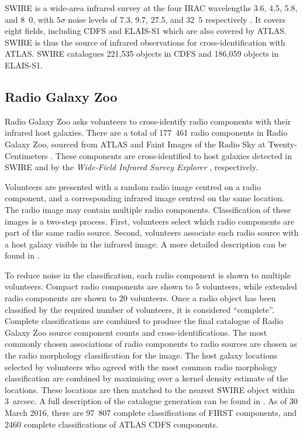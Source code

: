 \documentclass[fleqn,usenatbib,usedcolumn]{mnras}
\newcommand{\jansky}{\text{Jy}}
\begin{document}
    SWIRE \citep{lonsdale03swire, surace05swire} is a wide-area infrared survey
    at the four IRAC wavelengths 3.6, 4.5, 5.8, and
    \unit{8.0}{\micro\meter}, with $5\sigma$ noise levels of 7.3,
    9.7, 27.5, and \unit{32.5}{\micro\jansky} respectively
    \citep{lonsdale03swire}. It covers eight fields, including CDFS and ELAIS-S1
    which are also covered by ATLAS. SWIRE is thus the source of infrared
    observations for cross-identification with ATLAS. SWIRE catalogues 221,535
    objects in CDFS and 186,059 objects in ELAIS-S1.

  \subsection{Radio Galaxy Zoo}\label{sec:rgz}

    Radio Galaxy Zoo asks volunteers to cross-identify radio components with
    their infrared host galaxies. There are a total of 177~461 radio components
    in Radio Galaxy Zoo, sourced from ATLAS and Faint Images of the Radio Sky at
    Twenty-Centimeters \citep[FIRST;][]{white97first}. These components are
    cross-identified to host galaxies detected in SWIRE and by the
    \emph{Wide-Field Infrared Survey Explorer} \citep[WISE;][]{wright10wise},
    respectively.

    Volunteers are presented with a random radio image centred on a radio
    component, and a corresponding infrared image centred on the same
    location. The radio image may contain multiple radio components.
    Classification of these images is a two-step process. First, volunteers
    select which radio components are part of the same radio source. Second,
    volunteers associate each radio source with a host galaxy visible in the
    infrared image. A more detailed description can be found in
    \citet{banfield15}.

    To reduce noise in the classification, each radio component is shown to
    multiple volunteers. Compact radio components are shown to 5 volunteers,
    while extended radio components are shown to 20 volunteers. Once a radio
    object has been classified by the required number of volunteers, it is
    considered ``complete''. Complete classifications are combined to produce
    the final catalogue of Radio Galaxy Zoo source component counts and
    cross-identifications. The most commonly chosen associations of radio
    components to radio sources are chosen as the radio morphology
    classification for the image. The host galaxy locations selected by
    volunteers who agreed with the most common radio morphology classification
    are combined by maximising over a kernel density estimate of the locations.
    These locations are then matched to the nearest SWIRE object within
    3~arcsec. A full description of the catalogue generation can be found in
    \citet{wong17}. As of 30 March 2016, there are 97~807 complete
    classifications of FIRST components, and 2460 complete classifications of
    ATLAS CDFS components.
\end{document}
